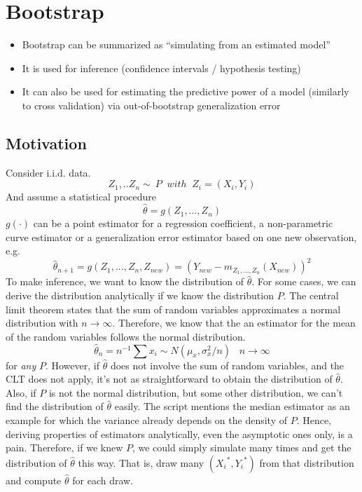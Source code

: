 \documentclass[]{book}
\providecommand{\tightlist}{%
  \setlength{\itemsep}{0pt}\setlength{\parskip}{0pt}}
\begin{document}
\chapter{Bootstrap}\label{bootstrap}

\begin{itemize}
\tightlist
\item
  Bootstrap can be summarized as ``simulating from an estimated model''
\item
  It is used for inference (confidence intervals / hypothesis testing)
\item
  It can also be used for estimating the predictive power of a model
  (similarly to cross validation) via out-of-bootstrap generalization
  error
\end{itemize}

\section{Motivation}\label{motivation}

Consider i.i.d. data.
\[ Z_1, .. Z_n \sim\ P \;\; with \; \;Z_i = (X_i, Y_i)\] And assume a
statistical procedure \[ \hat{\theta} = g(Z_1, ..., Z_n) \] \(g(\cdot)\)
can be a point estimator for a regression coefficient, a non-parametric
curve estimator or a generalization error estimator based on one new
observation, e.g.
\[ \hat{\theta}_{n+1} = g(Z_1, ..., Z_{n}, Z_{new}) = (Y_{new} - m_{Z_1, ..., Z_{n}}(X_{new}))^2 \]
To make inference, we want to know the distribution of \(\hat{\theta}\).
For some cases, we can derive the distribution analytically if we know
the distribution \(P\). The central limit theorem states that the sum of
random variables approximates a normal distribution with
\(n \rightarrow \infty\). Therefore, we know that the an estimator for
the mean of the random variables follows the normal distribution.
\[ \hat{\theta}_{n} = n^{-1}\sum x_i \sim N(\mu_x, \sigma_x^2 / n) \; \; \; n \rightarrow \infty \]
for \emph{any} \(P\). However, if \(\hat{\theta}\) does not involve the
sum of random variables, and the CLT does not apply, it's not as
straightforward to obtain the distribution of \(\hat{\theta}\). Also, if
\(P\) is not the normal distribution, but some other distribution, we
can't find the distribution of \(\hat{\theta}\) easily. The script
mentions the median estimator as an example for which the variance
already depends on the density of \(P\). Hence, deriving properties of
estimators analytically, even the asymptotic ones only, is a pain.
Therefore, if we knew \(P\), we could simply simulate many times and get
the distribution of \(\hat{\theta}\) this way. That is, draw many
\(({X_i}^*, {Y_i}^*)\) from that distribution and compute
\(\hat{\theta}\) for each draw.
\end{document}
